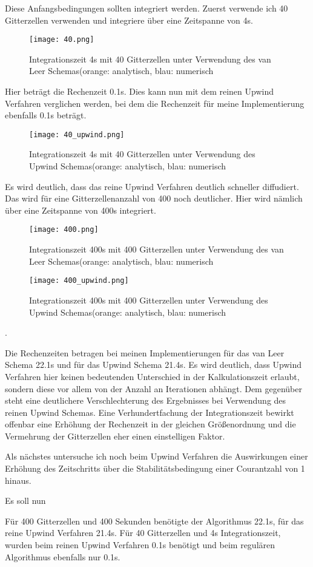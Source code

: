 \documentclass[12pt]{article}
\begin{document}
Diese Anfangsbedingungen sollten integriert werden. Zuerst verwende ich 40 Gitterzellen verwenden und integriere über eine Zeitspanne von 4s.

\begin{figure}[H]\texttt{[image: 40.png]}\caption{Integrationszeit 4s mit 40 Gitterzellen unter Verwendung des van Leer Schemas(orange: analytisch, blau: numerisch}\end{figure}

Hier beträgt die Rechenzeit 0.1s. Dies kann nun mit dem reinen Upwind Verfahren verglichen werden, bei dem die Rechenzeit für meine Implementierung ebenfalls 0.1s beträgt.

\begin{figure}[H]\texttt{[image: 40\_upwind.png]}\caption{Integrationszeit 4s mit 40 Gitterzellen unter Verwendung des Upwind Schemas(orange: analytisch, blau: numerisch}\end{figure}

Es wird deutlich, dass das reine Upwind Verfahren deutlich schneller diffudiert. Das wird für eine Gitterzellenanzahl von 400 noch deutlicher. Hier wird nämlich über eine Zeitspanne von 400s integriert.

\begin{figure}[H]\texttt{[image: 400.png]}\caption{Integrationszeit 400s mit 400 Gitterzellen unter Verwendung des van Leer Schemas(orange: analytisch, blau: numerisch}\end{figure}

\begin{figure}[H]\texttt{[image: 400\_upwind.png]}\caption{Integrationszeit 400s mit 400 Gitterzellen unter Verwendung des Upwind Schemas(orange: analytisch, blau: numerisch}\end{figure}.

Die Rechenzeiten betragen bei meinen Implementierungen für das van Leer Schema 22.1s und für das Upwind Schema 21.4s. Es wird deutlich, dass Upwind Verfahren hier keinen bedeutenden Unterschied in der Kalkulationszeit erlaubt, sondern diese vor allem von der Anzahl an Iterationen abhängt. Dem gegenüber steht eine deutlichere Verschlechterung des Ergebnisses bei Verwendung des reinen Upwind Schemas. Eine Verhundertfachung der Integrationszeit bewirkt offenbar eine Erhöhung der Rechenzeit in der gleichen Größenordnung und die Vermehrung der Gitterzellen eher einen einstelligen Faktor.

Als nächstes untersuche ich noch beim Upwind Verfahren die Auswirkungen einer Erhöhung des Zeitschritts über die Stabilitätsbedingung einer Courantzahl von 1 hinaus.




Es soll nun

Für 400 Gitterzellen und 400 Sekunden benötigte der Algorithmus 22.1s, für das reine Upwind Verfahren 21.4s.
Für 40 Gitterzellen und 4s Integrationszeit, wurden beim reinen Upwind Verfahren 0.1s benötigt und beim regulären Algorithmus ebenfalls nur 0.1s.
\end{document}
